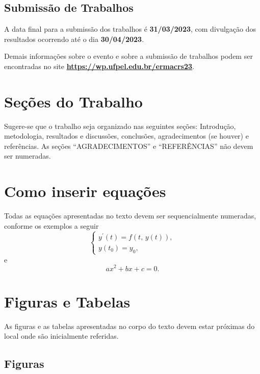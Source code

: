 \documentclass{ermacrs2023}
\begin{document}
  \subsection{Submissão de Trabalhos}\label{subsec:submissao}

  A data final para a submissão dos trabalhos é \textbf{31/03/2023}, com divulgação dos resultados ocorrendo até o dia \textbf{30/04/2023}.
  
  Demais informações sobre o evento e sobre a submissão de trabalhos podem ser encontradas no site \href{https://wp.ufpel.edu.br/ermacrs23}{\textbf{\underline{https://wp.ufpel.edu.br/ermacrs23}}}. 
  
  \section{Seções do Trabalho}\label{sec:secoes-trabalho}
  
  Sugere-se que o trabalho seja organizado nas seguintes seções: Introdução, metodologia, resultados e discussões, conclusões, agradecimentos (se houver) e referências. As seções ``AGRADECIMENTOS'' e ``REFERÊNCIAS'' não devem ser numeradas.
  
  \section{Como inserir  equações}\label{sec:equacoes} 
  
  Todas as equações apresentadas no texto devem ser sequencialmente numeradas, conforme os exemplos a seguir
  \begin{equation}\label{eq:pvi}
    \begin{cases}
      y^{\prime}(t) = f(t,\,y(t)),\\
      y(t_{0}) = y_{0},
    \end{cases} 
  \end{equation}
  e
  \begin{equation}\label{eq:equacao-quadratica}
    ax^{2} + bx + c = 0.
  \end{equation}
 
  \section{Figuras e Tabelas}\label{sec:figuras-tabelas}

  As figuras e as tabelas apresentadas no corpo do texto devem estar próximas do local onde são inicialmente referidas.

  \subsection{Figuras}\label{subsec:figuras}
  
\end{document}
